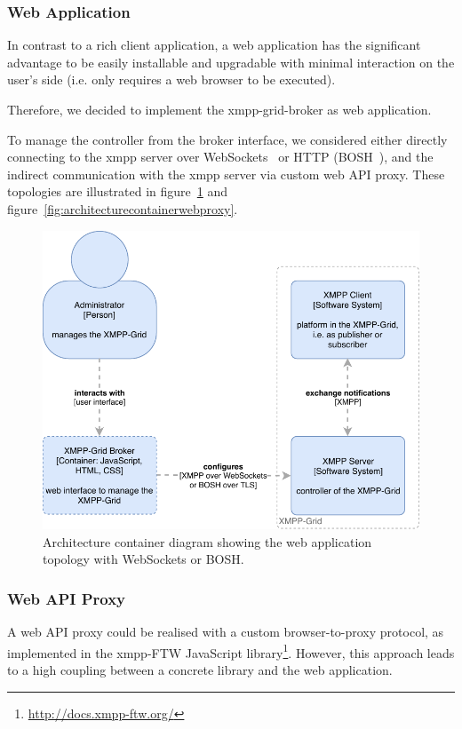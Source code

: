 \subsubsection{Web Application}

In contrast to a rich client application, a web application has the significant advantage to be easily installable and upgradable with minimal interaction on the user's side (i.e. only requires a web browser to be executed).

Therefore, we decided to implement the \gls{xmpp-grid-broker} as web application.

To manage the \gls{controller} from the \gls{broker} interface, we considered either directly connecting to the \gls{xmpp} server over WebSockets~\cite{rfc7395} or HTTP (BOSH~\cite{xep-0124}), and the indirect communication with the \gls{xmpp} server via custom web API proxy.
These topologies are illustrated in figure~\ref{fig:architecturecontainerwebapplication} and figure~\ref{fig:architecturecontainerwebproxy}.

\begin{figure}[h]
\centering
\includegraphics[width=0.7\linewidth]{resources/architecture_container_webapplication}
\caption[Architecture container diagram: Web application]{Architecture container diagram showing the web application topology with WebSockets or BOSH.}
\label{fig:architecturecontainerwebapplication}
\end{figure}

\subsubsection{Web API Proxy}

A web API proxy could be realised with a custom browser-to-proxy protocol, as implemented in the \gls{xmpp}-FTW JavaScript library\footnote{\url{http://docs.xmpp-ftw.org/}}.
However, this approach leads to a high coupling between a concrete library and the web application.

